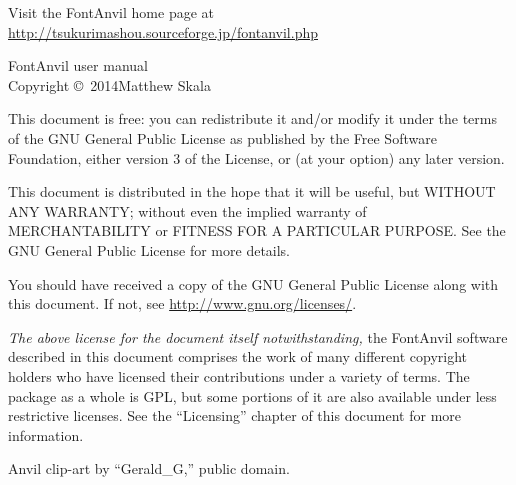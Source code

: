 \documentclass[11pt]{report}
\begin{document}
\begin{minipage}{\linewidth}
\noindent
Visit the FontAnvil home page at
\url{http://tsukurimashou.sourceforge.jp/fontanvil.php}

\vspace*{1in}

FontAnvil user manual\\
Copyright \copyright\ 2014\quad Matthew Skala

\vspace{\baselineskip}

This document is free: you can redistribute it and/or modify
it under the terms of the GNU General Public License as published by
the Free Software Foundation, either version 3 of the License, or
(at your option) any later version.

\vspace{\baselineskip}

This document is distributed in the hope that it will be useful,
but WITHOUT ANY WARRANTY; without even the implied warranty of
MERCHANTABILITY or FITNESS FOR A PARTICULAR PURPOSE.  See the
GNU General Public License for more details.

\vspace{\baselineskip}

You should have received a copy of the GNU General Public License
along with this document.  If not, see \url{http://www.gnu.org/licenses/}.

\vspace*{0.75in}

\emph{The above license for the document itself notwithstanding,} the
FontAnvil software described in this document comprises the work of many
different copyright holders who have licensed their contributions under a
variety of terms.  The package as a whole is GPL, but some portions of it
are also available under less restrictive licenses.  See the ``Licensing''
chapter of this document for more information.

\vspace{\baselineskip}

Anvil clip-art by ``Gerald\_{}G,'' public domain.

\end{minipage}

\clearpage


\renewcommand\contentsname{Contents}
\renewcommand{\cftbeforesubsecskip}{0pt}
\end{document}
